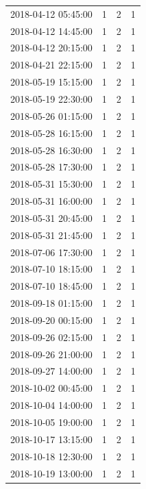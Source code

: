 \begin{tabular}{lrrr}
2018-04-12 05:45:00 & 1 & 2 & 1 \\
2018-04-12 14:45:00 & 1 & 2 & 1 \\
2018-04-12 20:15:00 & 1 & 2 & 1 \\
2018-04-21 22:15:00 & 1 & 2 & 1 \\
2018-05-19 15:15:00 & 1 & 2 & 1 \\
2018-05-19 22:30:00 & 1 & 2 & 1 \\
2018-05-26 01:15:00 & 1 & 2 & 1 \\
2018-05-28 16:15:00 & 1 & 2 & 1 \\
2018-05-28 16:30:00 & 1 & 2 & 1 \\
2018-05-28 17:30:00 & 1 & 2 & 1 \\
2018-05-31 15:30:00 & 1 & 2 & 1 \\
2018-05-31 16:00:00 & 1 & 2 & 1 \\
2018-05-31 20:45:00 & 1 & 2 & 1 \\
2018-05-31 21:45:00 & 1 & 2 & 1 \\
2018-07-06 17:30:00 & 1 & 2 & 1 \\
2018-07-10 18:15:00 & 1 & 2 & 1 \\
2018-07-10 18:45:00 & 1 & 2 & 1 \\
2018-09-18 01:15:00 & 1 & 2 & 1 \\
2018-09-20 00:15:00 & 1 & 2 & 1 \\
2018-09-26 02:15:00 & 1 & 2 & 1 \\
2018-09-26 21:00:00 & 1 & 2 & 1 \\
2018-09-27 14:00:00 & 1 & 2 & 1 \\
2018-10-02 00:45:00 & 1 & 2 & 1 \\
2018-10-04 14:00:00 & 1 & 2 & 1 \\
2018-10-05 19:00:00 & 1 & 2 & 1 \\
2018-10-17 13:15:00 & 1 & 2 & 1 \\
2018-10-18 12:30:00 & 1 & 2 & 1 \\
2018-10-19 13:00:00 & 1 & 2 & 1 \\
\bottomrule
\end{tabular}
